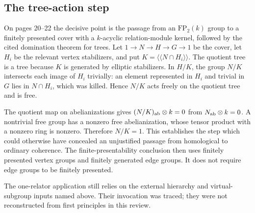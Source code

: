 \documentclass[10pt]{article}
\begin{document}
\subsection*{The tree-action step}
On pages 20–22 the decisive point is the passage from an \(\mathrm{FP}_2(k)\) group to a finitely presented cover with a \(k\)-acyclic relation-module kernel, followed by the cited domination theorem for trees. Let \(1\to N\to H\to G\to1\) be the cover, let \(H_i\) be the relevant vertex stabilizers, and put \(K=\langle\!\langle N\cap H_i\rangle\!\rangle\). The quotient tree is a tree because \(K\) is generated by elliptic stabilizers. In \(H/K\), the group \(N/K\) intersects each image of \(H_i\) trivially: an element represented in \(H_i\) and trivial in \(G\) lies in \(N\cap H_i\), which was killed. Hence \(N/K\) acts freely on the quotient tree and is free.\par
The quotient map on abelianizations gives \((N/K)_{\rm ab}\otimes k=0\) from \(N_{\rm ab}\otimes k=0\). A nontrivial free group has a nonzero free abelianization, whose tensor product with a nonzero ring is nonzero. Therefore \(N/K=1\). This establishes the step which could otherwise have concealed an unjustified passage from homological to ordinary coherence. The finite-presentability conclusion then uses finitely presented vertex groups and finitely generated edge groups. It does not require edge groups to be finitely presented.\par
The one-relator application still relies on the external hierarchy and virtual-subgroup inputs named above. Their invocation was traced; they were not reconstructed from first principles in this review.\par
\end{document}
